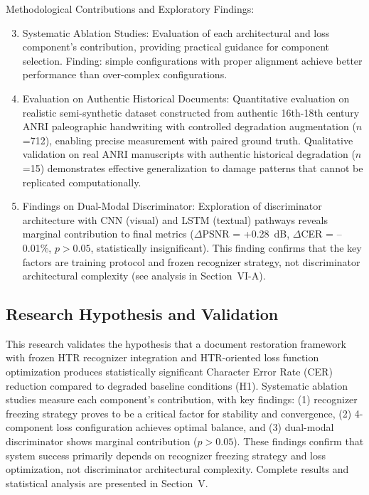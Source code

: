\documentclass[journal]{IEEEtran}
\begin{document}
Methodological Contributions and Exploratory Findings:
\begin{enumerate}
    \setcounter{enumi}{2}
    \item Systematic Ablation Studies: Evaluation of each architectural and loss component's contribution, providing practical guidance for component selection. Finding: simple configurations with proper alignment achieve better performance than over-complex configurations.
    
    \item Evaluation on Authentic Historical Documents: Quantitative evaluation on realistic semi-synthetic dataset constructed from authentic 16th-18th century ANRI paleographic handwriting with controlled degradation augmentation ($n$=712), enabling precise measurement with paired ground truth. Qualitative validation on real ANRI manuscripts with authentic historical degradation ($n$=15) demonstrates effective generalization to damage patterns that cannot be replicated computationally.
    
    \item Findings on Dual-Modal Discriminator: Exploration of discriminator architecture with CNN (visual) and LSTM (textual) pathways reveals marginal contribution to final metrics ($\Delta$PSNR = +0.28~dB, $\Delta$CER = --0.01\%, $p>0.05$, statistically insignificant). This finding confirms that the key factors are training protocol and frozen recognizer strategy, not discriminator architectural complexity (see analysis in Section~VI-A).
\end{enumerate}

\subsection{Research Hypothesis and Validation}

This research validates the hypothesis that a document restoration framework with frozen HTR recognizer integration and HTR-oriented loss function optimization produces statistically significant Character Error Rate (CER) reduction compared to degraded baseline conditions (H1). Systematic ablation studies measure each component's contribution, with key findings: (1) recognizer freezing strategy proves to be a critical factor for stability and convergence, (2) 4-component loss configuration achieves optimal balance, and (3) dual-modal discriminator shows marginal contribution ($p>0.05$). These findings confirm that system success primarily depends on recognizer freezing strategy and loss optimization, not discriminator architectural complexity. Complete results and statistical analysis are presented in Section~V.
\end{document}
